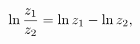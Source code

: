 \[\mathop{\ln\/}\nolimits\frac{z_{1}}{z_{2}}=\mathop{\ln\/}\nolimits z_{1}-%
\mathop{\ln\/}\nolimits z_{2},\]